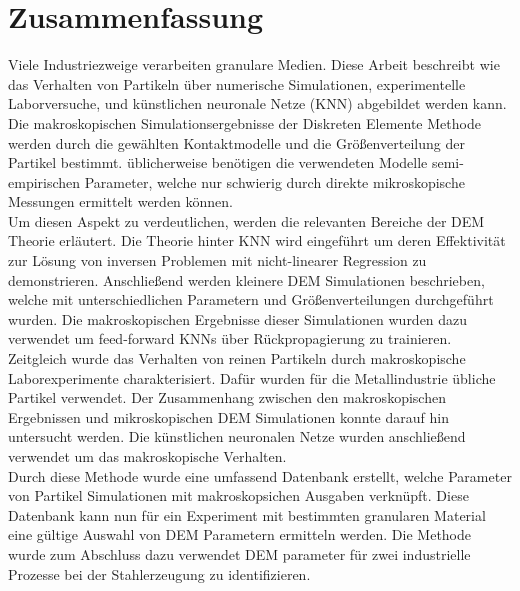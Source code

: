 \chapter*{Zusammenfassung}
\label{cap:zusammenfassung}
Viele Industriezweige verarbeiten granulare Medien.
Diese Arbeit beschreibt wie das Verhalten von Partikeln \"{u}ber numerische Simulationen, 
experimentelle Laborversuche, und k\"{u}nstlichen neuronale Netze (KNN) abgebildet werden kann.
Die makroskopischen Simulationsergebnisse der Diskreten Elemente Methode 
werden durch die gew\"{a}hlten Kontaktmodelle und die Gr\"{o}{\ss}enverteilung der Partikel bestimmt.
\"{u}blicherweise ben\"{o}tigen die verwendeten Modelle semi-empirischen Parameter,
welche nur schwierig durch direkte mikroskopische Messungen ermittelt werden
k\"{o}nnen.\\
Um diesen Aspekt zu verdeutlichen, werden die relevanten Bereiche der DEM Theorie erl\"{a}utert.
Die Theorie hinter KNN wird eingef\"{u}hrt um deren Effektivit\"{a}t zur L\"{o}sung von inversen 
Problemen mit nicht-linearer Regression zu demonstrieren.
Anschlie{\ss}end werden kleinere DEM Simulationen beschrieben, welche mit unterschiedlichen Parametern und 
Gr\"{o}{\ss}enverteilungen durchgef\"{u}hrt wurden.
Die makroskopischen Ergebnisse dieser Simulationen wurden dazu verwendet um
feed-forward KNNs \"{u}ber R\"{u}ckpropagierung zu trainieren.\\
Zeitgleich wurde das Verhalten von reinen Partikeln durch makroskopische Laborexperimente charakterisiert. 
Daf\"{u}r wurden f\"{u}r die Metallindustrie \"{u}bliche Partikel verwendet.
Der Zusammenhang zwischen den makroskopischen Ergebnissen und mikroskopischen DEM 
Simulationen konnte darauf hin untersucht werden.
Die k\"{u}nstlichen neuronalen Netze wurden anschlie{\ss}end verwendet um das
makroskopische Verhalten.\\
Durch diese Methode wurde eine umfassend Datenbank erstellt, welche Parameter von 
Partikel Simulationen mit makroskopsichen Ausgaben verkn\"{u}pft.
Diese Datenbank kann nun f\"{u}r ein Experiment mit bestimmten granularen Material eine 
g\"{u}ltige Auswahl von DEM Parametern ermitteln werden.
Die Methode wurde zum Abschluss dazu verwendet DEM parameter f\"{u}r zwei industrielle 
Prozesse bei der Stahlerzeugung zu identifizieren.
